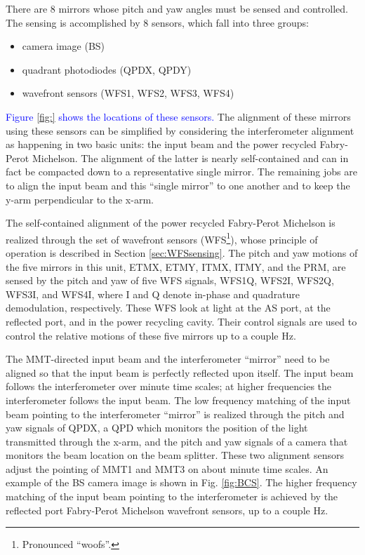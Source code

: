 There are 8 mirrors whose pitch and yaw angles must be sensed and controlled. The sensing is accomplished by 8 sensors, which fall into three groups:
\begin{itemize}
\item camera image (BS)  \vspace{-10pt}
\item quadrant photodiodes (QPDX, QPDY) \vspace{-10pt}
\item wavefront sensors (WFS1, WFS2, WFS3, WFS4)
\end{itemize}
\textcolor{blue}{Figure \ref{fig:} shows the locations of these sensors.} 
The alignment of these mirrors using these sensors can be simplified by considering the interferometer alignment as happening in two basic units: the input beam and the power recycled Fabry-Perot Michelson. The alignment of the latter is nearly self-contained and can in fact be compacted down to a representative single mirror. The remaining jobs are to align the input beam and this ``single mirror'' to one another and to keep the y-arm perpendicular to the x-arm.

The self-contained alignment of the power recycled Fabry-Perot Michelson is realized through the set of wavefront sensors (WFS\footnote{Pronounced ``woofs''.}), whose principle of operation is described in Section \ref{sec:WFSsensing}. The pitch and yaw motions of the five mirrors in this unit, ETMX, ETMY, ITMX, ITMY, and the PRM, are sensed by the pitch and yaw of five WFS signals, WFS1Q, WFS2I, WFS2Q, WFS3I, and WFS4I, where I and Q denote in-phase and quadrature demodulation, respectively. These WFS look at light at the AS port, at the reflected port, and in the power recycling cavity. Their control signals are used to control the relative motions of these five mirrors up to a couple Hz. 

The MMT-directed input beam and the interferometer ``mirror'' need to be aligned so that the input beam is perfectly reflected upon itself. The input beam follows the interferometer over minute time scales; at higher frequencies the interferometer follows the input beam. The low frequency matching of the input beam pointing to the interferometer ``mirror'' is realized through the pitch and yaw signals of QPDX, a QPD which monitors the position of the light transmitted through the x-arm, and the pitch and yaw signals of a camera that monitors the beam location on the beam splitter. These two alignment sensors adjust the pointing of MMT1 and MMT3 on about minute time scales. An example of the BS camera image is shown in Fig. \ref{fig:BCS}. The higher frequency matching of the input beam pointing to the interferometer is achieved by the reflected port Fabry-Perot Michelson wavefront sensors, up to a couple Hz.

